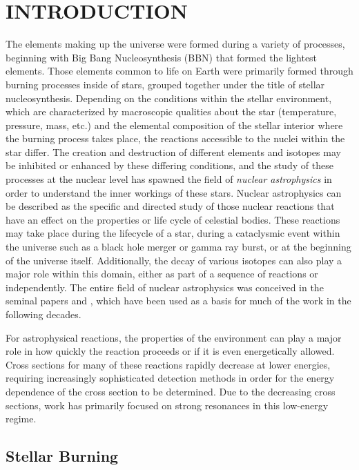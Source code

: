 
\chapter{INTRODUCTION}
\label{ch:introduction}

The elements making up the universe were formed during a variety of
processes, beginning with Big Bang Nucleosynthesis (BBN) that formed the
lightest elements. Those elements common to life on Earth were primarily
formed through burning processes inside of stars, grouped together under
the title of stellar nucleosynthesis. Depending on the conditions within
the stellar environment, which are characterized by macroscopic
qualities about the star (temperature, pressure, mass, etc.) and the
elemental composition of the stellar interior where the burning process
takes place, the reactions accessible to the nuclei within the star
differ. The creation and destruction of different elements and isotopes
may be inhibited or enhanced by these differing conditions, and the
study of these processes at the nuclear level has spawned the field of
\emph{nuclear astrophysics} in order to understand the inner workings of
these stars. Nuclear astrophysics can be described as the specific and
directed study of those nuclear reactions that have an effect on the
properties or life cycle of celestial bodies. These reactions may take
place during the lifecycle of a star, during a cataclysmic event within
the universe such as a black hole merger or gamma ray burst, or at the
beginning of the universe itself. Additionally, the decay of various
isotopes can also play a major role within this domain, either as part
of a sequence of reactions or independently. The entire field of nuclear
astrophysics was conceived in the seminal papers \cite{B2FH} and
\cite{Cameron1957}, which have been used as a basis for much of the work
in the following decades.

For astrophysical reactions, the properties of the environment can play
a major role in how quickly the reaction proceeds or if it is even
energetically allowed. Cross sections for many of these reactions
rapidly decrease at lower energies, requiring increasingly sophisticated
detection methods in order for the energy dependence of the cross
section to be determined. Due to the decreasing cross sections, work has
primarily focused on strong resonances in this low-energy regime.


\section{Stellar Burning}

